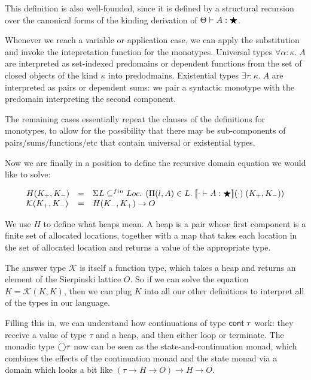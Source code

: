 This definition is also well-founded, since it is defined by a
structural recursion over the canonical forms of the kinding
derivation of $\judgeWK{A}{\bigstar}$. 

Whenever we reach a variable or application case, we can apply the
substitution and invoke the intepretation function for the
monotypes. Universal types $\forall \alpha:\kappa.\;A$ are interpreted
as set-indexed predomains or dependent functions from the set of
closed objects of the kind $\kappa$ into predodmains. Existential
types $\exists \tau:\kappa.\;A$ are interpreted as pairs or dependent
sums: we pair a syntactic monotype with the predomain interpreting the
second component.

The remaining cases essentially repeat the clauses of the definitions
for monotypes, to allow for the possibility that there may be
sub-components of pairs/sums/functions/etc that contain universal or
existential types.

Now we are finally in a position to define the recursive domain equation we 
would like to solve:

\begin{displaymath}
\begin{array}{lcl}
H(K_+,K_-) & = & \Sigma L \subseteq^{fin} Loc.\; 
                    \left(\Pi (l,A) \in L.\; 
                             \interp{\judgeWK[\cdot]{A}{\bigstar}}(\cdot)\;(K_+,K_-) 
                    \right)\\

\mathcal{K}(K_+,K_-) & = & H(K_-,K_+) \to O \\    
\end{array}
\end{displaymath}

We use $H$ to define what heaps mean. A heap is a pair whose first
component is a finite set of allocated locations, together with a map
that takes each location in the set of allocated location and returns 
a value of the appropriate type. 

The answer type $\mathcal{K}$ is itself a function type, which takes a
heap and returns an element of the Sierpinski lattice $O$. So if we
can solve the equation $K = \mathcal{K}(K, K)$, then we can plug $K$
into all our other definitions to interpret all of the types in our
language.

Filling this in, we can understand how continuations of type
$\cont{\tau}$ work: they receive a value of type $\tau$ and a heap,
and then either loop or terminate. The monadic type $\monad{\tau}$ now
can be seen as the state-and-continuation monad, which combines the
effects of the continuation monad and the state monad via a domain 
which looks a bit like $(\tau \to H \to O) \to H \to O$. 


